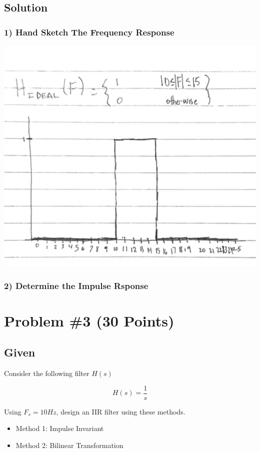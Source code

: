 \documentclass[12pt,letterpaper]{article}
\begin{document}
\subsection*{Solution}
\subsubsection*{1) Hand Sketch The Frequency Response}
\includegraphics*[scale=0.3]{p2p1.jpg}
\subsubsection*{2) Determine the Impulse Rsponse}




\newpage
\section*{Problem \#3 (30 Points)}
\hrulefill
\subsection*{Given}
Consider the following filter \( H(s) \)

\[
H(s) = \frac{1}{s}
\]

Using \( F_s = 10Hz \), design an IIR filter using these methods.
\begin{itemize}
    \item Method 1: Impulse Invariant
    \item Method 2: Bilinear Transformation
\end{itemize}
\end{document}
